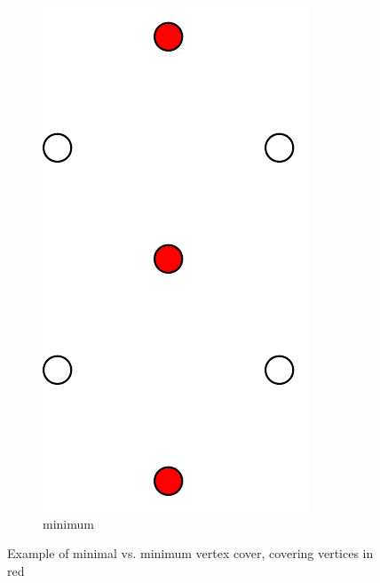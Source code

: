 \begin{figure}[ht]
  \hspace{2em}
  \begin{subfigure}{0.25\textwidth}
    \centering
    \includegraphics[width=\textwidth]{img/example_minimum_vertex_cover.pdf}
    \caption{minimum}
  \end{subfigure}
  \caption{\label{fig:example_vertex_cover}%
    Example of minimal vs. minimum vertex cover, covering vertices %
    in red
  }
\end{figure}

